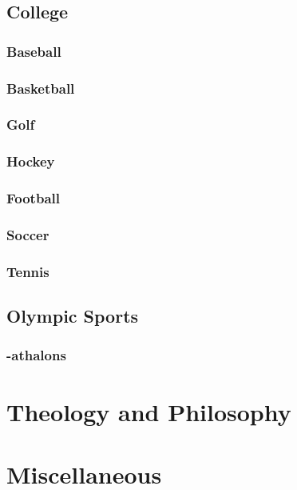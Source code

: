 \documentclass[12pt]{book}
\begin{document}
	\section{College}
		\subsection{Baseball}
		\subsection{Basketball}
		\subsection{Golf}
		\subsection{Hockey}
		\subsection{Football}
		\subsection{Soccer}
		\subsection{Tennis}
	\section{Olympic Sports}
		\subsection{-athalons}
		
\chapter{Theology and Philosophy}		
		
\chapter{Miscellaneous}
\end{document}
